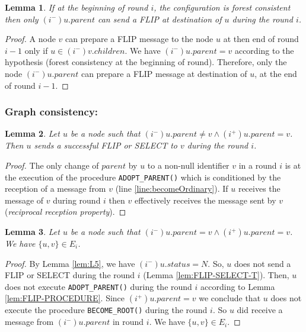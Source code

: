 \documentclass[twocolumn]{article}
\newtheorem{lemma}{Lemma}
\newcommand{\depends}[1]{}
\newcommand{\state}[3]{\ensuremath{(#2^{#3})#1}}
\newcommand{\uim}{\state{u}{i}{-}}
\newcommand{\vim}{\state{v}{i}{-}}
\newcommand{\uip}{\state{u}{i}{+}}
\begin{document}
\begin{lemma}
  \label{lem:cond-single-Flip}
If at the beginning of round $i$, the configuration 
is forest  consistent then only 
$\uim.parent$ can  send a FLIP at destination of $u$ during the round $i$.
\depends{\ref{th:consistency}}
\end{lemma}

\begin{proof}
A node $v$ can prepare a FLIP message to the node $u$ 
at then end of round $i-1$ only if $u \in \vim.children$.
We have $\uim.parent=v$ according to the hypothesis (forest consistency at the beginning of round). 
Therefore, only the node  $\uim.parent$ can prepare 
a FLIP message at destination of $u$, 
at the end of round $i-1$.
 \end{proof}



\subsubsection{Graph consistency:}
\begin{lemma}
  \label{lem:add_parent}
Let $u$ be a node such that $\uim.parent \neq v \wedge \uip.parent = v$.
Then $u$ sends a successful FLIP or SELECT to $v$ during the round $i$.
\end{lemma}
\begin{proof}
The only change of $parent$ by $u$ to a non-null identifier $v$ in 
a round $i$ is at the execution of the procedure \texttt{ADOPT\_PARENT()} 
which is conditioned by the reception of a message from $v$ (line \ref{line:becomeOrdinary}).
If $u$ receives the message of $v$ during round $i$ then $v$ effectively receives the
message sent by $v$ (\textit{reciprocal reception property}).
\end{proof}


\begin{lemma}
  \label{lem:keep_parent}
Let $u$ be a node such that $\uim.parent = v \wedge \uip.parent = v$.
We have $\{u,v\} \in E_i$.
\end{lemma}
\begin{proof}
By Lemma \ref{lem:L5}, we have $\uim.status=N$.
So, $u$ does not send a FLIP or SELECT during the round $i$ 
(Lemma \ref{lem:FLIP-SELECT-T}).
Then, $u$ does not execute \texttt{ADOPT\_PARENT()} during the round $i$
according to Lemma  \ref{lem:FLIP-PROCEDURE}.
Since $\uip.parent = v$ we conclude that
$u$ does not execute the procedure \texttt{BECOME\_ROOT()} during the round $i$.
So $u$ did receive a message from $\uim.parent$ in round $i$.
We have $\{u,v\} \in E_i$.
 \end{proof}
\end{document}
